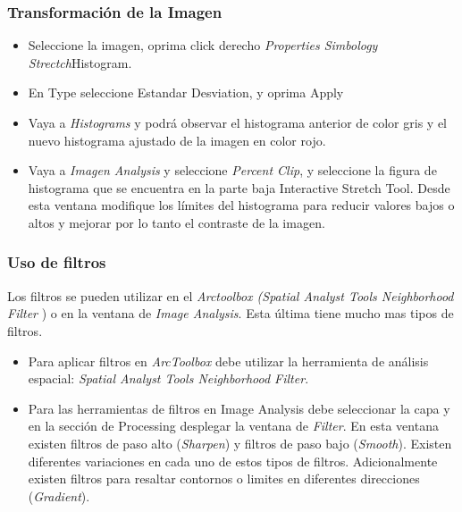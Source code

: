 \documentclass[a4paper,oneside,11pt,]{article}
\begin{document}
\subsubsection{Transformación de la Imagen}
\begin{itemize}
\item Seleccione  la imagen, oprima click derecho  \emph{Properties Simbology  Strectch}\textrightarrow Histogram.
\item En Type seleccione Estandar Desviation, y oprima Apply
\item Vaya a \emph{Histograms} y podrá observar el histograma anterior de color gris y el nuevo histograma ajustado de la imagen en color rojo.
\item Vaya a \emph{Imagen Analysis} y seleccione \emph{Percent Clip}, y seleccione la figura de histograma que se encuentra en la parte baja Interactive Stretch Tool. Desde esta ventana modifique los límites del histograma para reducir valores bajos o altos y mejorar por lo tanto el contraste de la imagen.
\end{itemize}

\subsubsection{Uso de filtros}
Los filtros se pueden utilizar en el \emph{Arctoolbox (Spatial Analyst Tools   Neighborhood   Filter} ) o en la ventana de \emph{Image Analysis}. Esta última tiene mucho mas tipos de filtros.
\begin{itemize}
\item Para aplicar filtros en \emph{ArcToolbox} debe utilizar la herramienta de análisis espacial: \emph{Spatial Analyst Tools   Neighborhood   Filter}.
\item Para las herramientas de filtros en Image Analysis debe seleccionar la capa y en la sección de Processing desplegar la ventana de \emph{Filter}. En esta ventana existen filtros de paso alto (\emph{Sharpen}) y filtros de paso bajo (\emph{Smooth}). Existen diferentes variaciones en cada uno de estos tipos de filtros. Adicionalmente existen filtros para resaltar contornos o limites en diferentes direcciones (\emph{Gradient}).
\end{itemize}
\end{document}
